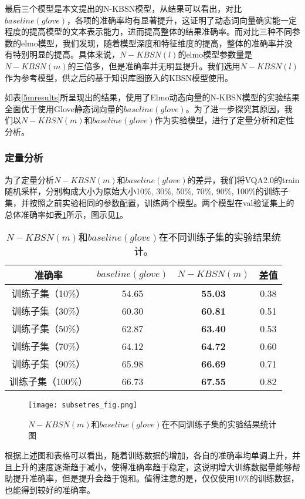 最后三个模型是本文提出的N-KBSN模型，从结果可以看出，对比$baseline(glove)$，各项的准确率均有显著提升，这证明了动态词向量确实能一定程度的提高模型的文本表示能力，进而提高整体的结果准确率。而对比三种不同参数的elmo模型，我们发现，随着模型深度和特征维度的提高，整体的准确率并没有特别明显的提高。具体来说，$N-KBSN(l)$的elmo模型参数量是$N-KBSN(m)$的三倍多，但是准确率并无明显提升。我们选用$N-KBSN(l)$作为参考模型，供之后的基于知识库图嵌入的KBSN模型使用。

如表\ref{5mresults}所呈现出的结果，使用了Elmo动态向量的N-KBSN模型的实验结果全面优于使用Glove静态词向量的$baseline(glove)$。为了进一步探究其原因，我们以$N-KBSN(m)$和$baseline(glove)$作为实验模型，进行了定量分析和定性分析。

\subsubsection{定量分析}
为了定量分析$N-KBSN(m)$和$baseline(glove)$的差异，我们将VQA2.0的train随机采样，分别构成大小为原始大小10\%, 30\%, 50\%, 70\%, 90\%, 100\%的训练子集，并按照之前实验相同的参数配置，训练两个模型。两个模型在val验证集上的总体准确率如表\ref{subsetres}所示，图示见\ref{subsetres_fig}。
\begin{table}[H]
\centering
\caption{$N-KBSN(m)$和$baseline(glove)$在不同训练子集的实验结果统计。}
\begin{tabular}{cccc}
\toprule
准确率 & $baseline(glove)$ & $N-KBSN(m)$ & 差值\\
\midrule
训练子集（10\%）&  54.65 & \textbf{55.03} & 0.38\\
训练子集（30\%）&  60.30& \textbf{60.81} & 0.51\\
训练子集（50\%）&  62.87& \textbf{63.40} & 0.53\\
训练子集（70\%）&  64.12& \textbf{64.72} & 0.60\\
训练子集（90\%）&  65.98& \textbf{66.69} & 0.71\\
训练子集（100\%）& 66.73 & \textbf{67.55} & 0.82\\
\bottomrule
\end{tabular}
\label{subsetres}
\end{table}
\begin{figure}[H]
	\texttt{[image: subsetres\_fig.png]}
	\caption{$N-KBSN(m)$和$baseline(glove)$在不同训练子集的实验结果统计图}
	\label{subsetres_fig}
\end{figure}

根据上述图和表格可以看出，随着训练数据的增加，各自的准确率均单调上升，并且上升的速度逐渐趋于减小，使得准确率趋于稳定，这说明增大训练数据量能够帮助提升准确率，但是提升会趋于饱和。值得注意的是，仅仅使用10\%的训练数据，也能得到较好的准确率。

